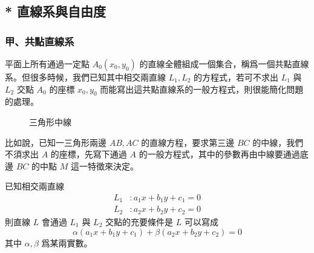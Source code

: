 \subsection{* 直線系與自由度}
\label{sec:4-6}

\subsubsection*{甲、共點直線系}

平面上所有通過一定點 $A_0(x_0, y_0)$ 的直線全體組成一個集合，稱爲一個共點直線系。但很多時候，我們已知其中相交兩直線 $L_1, L_2$ 的方程式，若可不求出 $L_1$ 與 $L_2$ 交點 $A_0$ 的座標 $x_0, y_0$ 而能寫出這共點直線系的一般方程式，則很能簡化問題的處理。

\begin{figure}[H]
\centering
{}
\caption{三角形中線}
\label{fig:4-44}
\end{figure}

比如說，已知一三角形兩邊 $AB, AC$ 的直線方程，要求第三邊 $BC$ 的中線，我們不須求出 $A$ 的座標，先寫下通過 $A$ 的一般方程式，其中的參數再由中線要通過底邊 $BC$ 的中點 $M$ 這一特徵來決定。

\begin{theorem}
已知相交兩直線
\begin{align*}
L_1 &: a_1 x + b_1 y + c_1 = 0 \\
L_2 &: a_2 x + b_2 y + c_2 = 0
\end{align*}
則直線 $L$ 會通過 $L_1$ 與 $L_2$ 交點的充要條件是 $L$ 可以寫成
\begin{equation}
\alpha(a_1 x + b_1 y + c_1) + \beta(a_2 x + b_2 y + c_2) = 0
\label{eq:b3s-4-36}
\end{equation}
其中 $\alpha, \beta$ 爲某兩實數。
\end{theorem}

